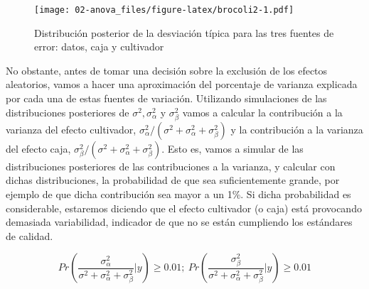 \documentclass[
]{book}
\begin{document}
\begin{figure}
\centering
\texttt{[image: 02-anova\_files/figure-latex/brocoli2-1.pdf]}
\caption{\label{fig:brocoli2}Distribución posterior de la desviación típica para las tres fuentes de error: datos, caja y cultivador}
\end{figure}

No obstante, antes de tomar una decisión sobre la exclusión de los efectos aleatorios, vamos a hacer una aproximación del porcentaje de varianza explicada por cada una de estas fuentes de variación. Utilizando simulaciones de las distribuciones posteriores de \(\sigma^2, \sigma_{\alpha}^2\) y \(\sigma_{\beta}^2\) vamos a calcular la contribución a la varianza del efecto cultivador, \(\sigma_{\alpha}^2/(\sigma^2 + \sigma_{\alpha}^2+\sigma_{\beta}^2)\) y la contribución a la varianza del efecto caja, \(\sigma_{\beta}^2/(\sigma^2 + \sigma_{\alpha}^2+\sigma_{\beta}^2)\). Esto es, vamos a simular de las distribuciones posteriores de las contribuciones a la varianza, y calcular con dichas distribuciones, la probabilidad de que sea suficientemente grande, por ejemplo de que dicha contribución sea mayor a un 1\%. Si dicha probabilidad es considerable, estaremos diciendo que el efecto cultivador (o caja) está provocando demasiada variabilidad, indicador de que no se están cumpliendo los estándares de calidad.

\[Pr\left(\frac{\sigma_{\alpha}^2}{\sigma^2 + \sigma_{\alpha}^2+\sigma_{\beta}^2}|y\right) \geq 0.01 ; \ Pr\left(\frac{\sigma_{\beta}^2}{\sigma^2 + \sigma_{\alpha}^2+\sigma_{\beta}^2}|y\right) \geq 0.01\]
\end{document}
